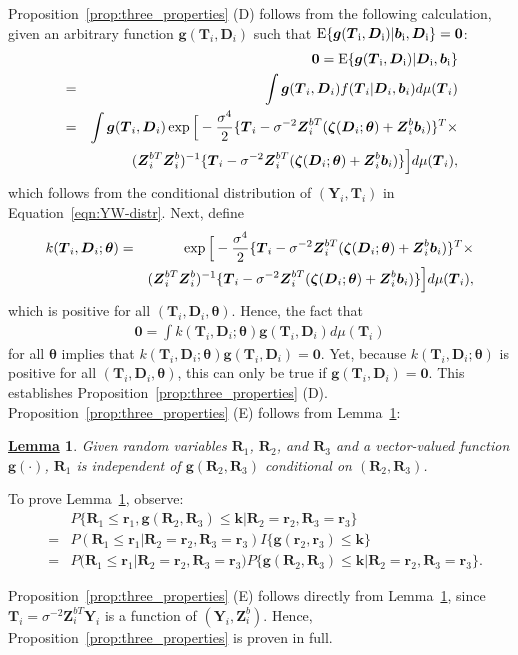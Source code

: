 \documentclass[12pt]{article}
\def\bse{\begin{eqnarray*}}
\def\ese{\end{eqnarray*}}
\def\bse{\begin{eqnarray*}}
\def\ese{\end{eqnarray*}}
\def\bzero{{\mathbf 0}}
\newcommand{\bzeta}{\mbox{\boldmath $\zeta$}}
\def\btheta{{\boldsymbol{\theta}}}
\def\bzero{{\boldsymbol{0}}}
\def\bb{{\boldsymbol b}}
\def\bg{{\boldsymbol g}}
\def\bk{{\boldsymbol k}}
\def\br{{\boldsymbol r}}
\def\bD{{\boldsymbol D}}
\def\bR{{\boldsymbol R}}
\def\bT{{\boldsymbol T}}
\def\bY{{\boldsymbol Y}}
\def\bZ{{\boldsymbol Z}}
\def\tilD{\bD}
\def\E{\rm E}
\newtheorem{Lem}{\underline{\bf Lemma}}
\begin{document}
Proposition~\ref{prop:three_properties} (D) follows from the following calculation, given an arbitrary function $\bg(\bT_i,\tilD_i)$ such that $\E\{\bg(\bT_i,\tilD_i)|\bb_i,\tilD_i\}=\bzero$:
\bse
&&\bzero=\E\{\bg(\bT_i,\tilD_i)|\tilD_i,\bb_i\}\\
&=& \int \bg(\bT_i,\tilD_i)f(\bT_i|\tilD_i,\bb_i)d\mu(\bT_i)\\
&=& \int \bg(\bT_i,\tilD_i)
\exp\Big[-\frac{\sigma^4}{2}\{\bT_i-\sigma^{-2}\bZ_i^{bT}(\bzeta (\tilD_i;\btheta)+\bZ_i^b\bb_i)\}^T\times\\
&&(\bZ_i^{bT}\bZ_i^{b})^{-1}\{\bT_i-\sigma^{-2}\bZ_i^{bT}(\bzeta(\tilD_i;\btheta) +\bZ_i^b\bb_i)\}\Big]d\mu(\bT_i),
\ese
which follows from the conditional distribution of $(\bY_i, \bT_i)$ in Equation~\eqref{eqn:YW-distr}. Next, define
\bse
k(\bT_i,\tilD_i;\btheta)&=&\exp\Big[-\frac{\sigma^4}{2}\{\bT_i-\sigma^{-2}\bZ_i^{bT}(\bzeta (\tilD_i;\btheta)+\bZ_i^b\bb_i)\}^T\times\\
&&(\bZ_i^{bT}\bZ_i^{b})^{-1}\{\bT_i-\sigma^{-2}\bZ_i^{bT}(\bzeta(\tilD_i;\btheta) +\bZ_i^b\bb_i)\}\Big]d\mu(\bT_i),
\ese
which is positive for all $(\bT_i,\tilD_i,\btheta)$. Hence, the fact that
\bse
\bzero = \int k(\bT_i,\tilD_i;\btheta)
\bg(\bT_i,\tilD_i)d\mu(\bT_i)
\ese
for all $\btheta$ implies that $k(\bT_i,\tilD_i;\btheta)\bg(\bT_i,\tilD_i)=\bzero$. Yet, because $k(\bT_i,\tilD_i;\btheta)$ is positive for all $(\bT_i,\tilD_i,\btheta)$, this can only be true if $\bg(\bT_i,\tilD_i)=\bzero$. This establishes Proposition~\ref{prop:three_properties} (D). Proposition~\ref{prop:three_properties} (E) follows from Lemma~\ref{lem:cond_ind_of_func}:

\begin{Lem}
\label{lem:cond_ind_of_func}
Given random variables $\bR_1$, $\bR_2$, and $\bR_3$ and a vector-valued function $\bg(\cdot)$, $\bR_1$ is independent of $\bg(\bR_2, \bR_3)$ conditional on $(\bR_2, \bR_3)$.
\end{Lem}
To prove Lemma~\ref{lem:cond_ind_of_func}, observe:
\bse
&&P\{\bR_1 \leq \br_1, \bg(\bR_2,\bR_3) \leq \bk | \bR_2 = \br_2, \bR_3 = \br_3\} \\
&=&P(\bR_1 \leq \br_1 | \bR_2 = \br_2, \bR_3 = \br_3)I\{\bg(\br_2,\br_3) \leq \bk\} \\
&=&P(\bR_1 \leq \br_1 | \bR_2 = \br_2, \bR_3 = \br_3)P\{\bg(\bR_2,\bR_3) \leq \bk | \bR_2 = \br_2, \bR_3 = \br_3\}.
\ese

Proposition~\ref{prop:three_properties} (E) follows directly from Lemma~\ref{lem:cond_ind_of_func}, since $\bT_i = \sigma^{-2}\bZ_i^{bT}\bY_i$ is a function of $(\bY_i, \bZ_i^b)$. Hence, Proposition~\ref{prop:three_properties} is proven in full. 
\end{document}
